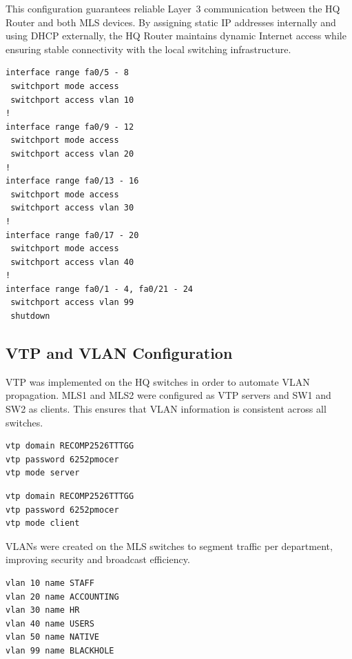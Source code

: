 This configuration guarantees reliable Layer~3 communication between the HQ Router and both MLS devices.  
By assigning static \ac{IP} addresses internally and using \ac{DHCP} externally, the HQ Router maintains dynamic Internet access while ensuring stable connectivity with the local switching infrastructure.


\begin{lstlisting}[caption={Access port configuration on SW1 and SW2}, label={lst:sw1-sw2-access}]
interface range fa0/5 - 8
 switchport mode access
 switchport access vlan 10
!
interface range fa0/9 - 12
 switchport mode access
 switchport access vlan 20
!
interface range fa0/13 - 16
 switchport mode access
 switchport access vlan 30
!
interface range fa0/17 - 20
 switchport mode access
 switchport access vlan 40
!
interface range fa0/1 - 4, fa0/21 - 24
 switchport access vlan 99
 shutdown
\end{lstlisting}

\subsection{\ac{VTP} and \ac{VLAN} Configuration}

\ac{VTP} was implemented on the HQ switches in order to automate \ac{VLAN} propagation.  
MLS1 and MLS2 were configured as \ac{VTP} servers and SW1 and SW2 as clients.  
This ensures that \ac{VLAN} information is consistent across all switches.

\begin{lstlisting}[caption={VTP configuration on MLS1 and MLS2}, label={lst:vtp-config}]
vtp domain RECOMP2526TTTGG
vtp password 6252pmocer
vtp mode server
\end{lstlisting}

\begin{lstlisting}[caption={VTP configuration on SW1 and SW2}, label={lst:vtp-clients}]
vtp domain RECOMP2526TTTGG
vtp password 6252pmocer
vtp mode client
\end{lstlisting}

\ac{VLAN}s were created on the MLS switches to segment traffic per department, improving security and broadcast efficiency.

\begin{lstlisting}[caption={VLAN creation on MLS1 and MLS2\cite{tp2_layer2_security}}, label={lst:mls1-msl2-vlans}]
vlan 10 name STAFF
vlan 20 name ACCOUNTING
vlan 30 name HR
vlan 40 name USERS
vlan 50 name NATIVE
vlan 99 name BLACKHOLE
\end{lstlisting}

